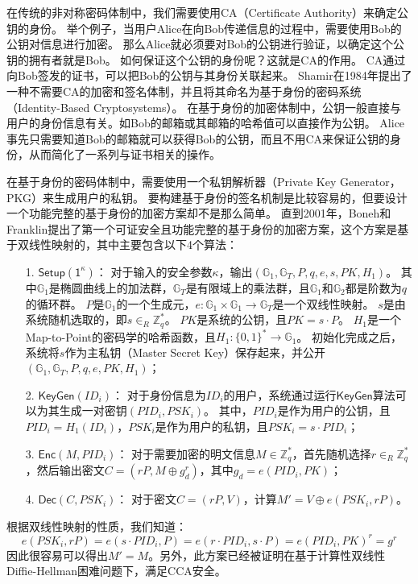 在传统的非对称密码体制中，我们需要使用CA（Certificate Authority）来确定公钥的身份。
举个例子，当用户Alice在向Bob传递信息的过程中，需要使用Bob的公钥对信息进行加密。
那么Alice就必须要对Bob的公钥进行验证，以确定这个公钥的拥有者就是Bob。
如何保证这个公钥的身份呢？这就是CA的作用。
CA通过向Bob签发的证书，可以把Bob的公钥与其身份关联起来。
Shamir在1984年提出了一种不需要CA的加密和签名体制\cite{shamir1984identity}，并且将其命名为基于身份的密码系统（Identity-Based Cryptosystems）。
在基于身份的加密体制中，公钥一般直接与用户的身份信息有关。如Bob的邮箱或其邮箱的哈希值可以直接作为公钥。
Alice事先只需要知道Bob的邮箱就可以获得Bob的公钥，而且不用CA来保证公钥的身份，从而简化了一系列与证书相关的操作。

在基于身份的密码体制中，需要使用一个私钥解析器（Private Key Generator，PKG）来生成用户的私钥。
要构建基于身份的签名机制是比较容易的，但要设计一个功能完整的基于身份的加密方案却不是那么简单。
直到2001年，Boneh和Franklin提出了第一个可证安全且功能完整的基于身份的加密方案\cite{boneh2001identity}，这个方案是基于双线性映射的，其中主要包含以下4个算法：

\begin{itemize}
  \item[1.] $\mathsf{Setup(1^\kappa)}$： 对于输入的安全参数$\kappa$，输出$(\mathbb{G}_1,\mathbb{G}_T,P,q,e,s,PK,H_1)$。
  其中$\mathbb{G}_1$是椭圆曲线上的加法群，$\mathbb{G}_T$是有限域上的乘法群，且$\mathbb{G}_1$和$\mathbb{G}_2$都是阶数为$q$的循环群。
  $P$是$\mathbb{G}_1$的一个生成元，$e:\mathbb{G}_1\times\mathbb{G}_1\rightarrow \mathbb{G}_T$是一个双线性映射。
  $s$是由系统随机选取的，即$s\in_R \mathbb{Z}_q^*$。
  $PK$是系统的公钥，且$PK=s\cdot P$。
  $H_1$是一个Map-to-Point的密码学的哈希函数，且$H_1:\{0,1\}^*\rightarrow\mathbb{G}_1$。
  初始化完成之后，系统将$s$作为主私钥（Master Secret Key）保存起来，并公开$(\mathbb{G}_1,\mathbb{G}_T,P,q,e,PK,H_1)$；
  \item[2.] $\mathsf{KeyGen}(ID_i)$： 对于身份信息为$ID_i$的用户，系统通过运行$\mathsf{KeyGen}$算法可以为其生成一对密钥$(PID_i,PSK_i)$。
  其中，$PID_i$是作为用户的公钥，且$PID_i=H_1(ID_i)$，$PSK_i$是作为用户的私钥，且$PSK_i=s\cdot PID_i$；
  \item[3.] $\mathsf{Enc}(M,PID_i)$： 对于需要加密的明文信息$M\in\mathbb{Z}_q^*$，首先随机选择$r\in_R\mathbb{Z}_q^*$，然后输出密文$C=(rP,M\oplus g_d^r)$，其中$g_d=e(PID_i,PK)$；
  \item[4.] $\mathsf{Dec}(C,PSK_i)$： 对于密文$C=(rP,V)$，计算$M'=V\oplus e(PSK_i,rP)$。
\end{itemize}
根据双线性映射的性质，我们知道：
$$e(PSK_i,rP)=e(s\cdot PID_i, P)=e(r\cdot PID_i, s\cdot P)=e(PID_i,PK)^r=g^r$$
因此很容易可以得出$M'=M$。另外，此方案已经被证明在基于计算性双线性Diffie-Hellman困难问题下，满足CCA安全。

